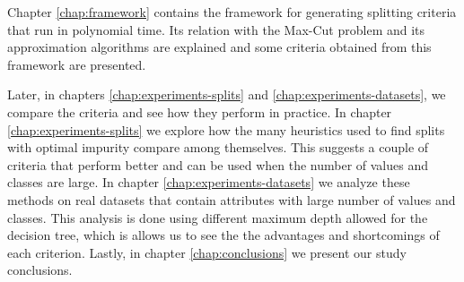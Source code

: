 Chapter \ref{chap:framework} contains the framework for generating splitting criteria that run in polynomial time. Its relation with the Max-Cut problem and its approximation algorithms are explained and some criteria obtained from this framework are presented.

Later, in chapters \ref{chap:experiments-splits} and \ref{chap:experiments-datasets}, we compare the criteria and see how they perform in practice. In chapter \ref{chap:experiments-splits} we explore how the many heuristics used to find splits with optimal impurity compare among themselves. This suggests a couple of criteria that perform better and can be used when the number of values and classes are large. In chapter \ref{chap:experiments-datasets} we analyze these methods on real datasets that contain attributes with large number of values and classes. This analysis is done using different maximum depth allowed for the decision tree, which is allows us to see the the advantages and shortcomings of each criterion. Lastly, in chapter \ref{chap:conclusions} we present our study conclusions.

